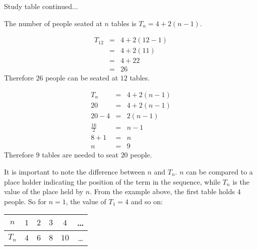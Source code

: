 \begin{wex}{Study table continued...}
{
The number of people seated at $n$ tables is $T_n = 4 + 2(n-1)$.


\begin{eqnarray*}
T_{12} &=& 4 + 2  (12 - 1) \\
&=& 4 + 2(11) \\
&=& 4 + 22 \\
&=& 26
\end{eqnarray*}
Therefore $26$ people can be seated at $12$ tables.

\begin{eqnarray*}
T_n &=& 4 + 2  (n - 1) \\
20 &=& 4 + 2  (n - 1) \\
20 - 4 &=& 2  (n - 1) \\
\frac{16}{2} &=& n - 1 \\
8 + 1 &=& n \\
n &=& 9
\end{eqnarray*}
Therefore $9$ tables are needed to seat $20$ people.
}
\end{wex}

It is important to note the difference between $n$ and ${T}_{n}$. $n$ can be compared to a place holder indicating the position of the term in the sequence, 
while ${T}_{n}$ is the value of the place held by $n$. From the example above, the first table holds $4$ people. So for $n=1$, the value of ${T}_{1}=4$ and so on:\par 
    
\begin{center}
\begin{tabular}{|c|c|c|c|c|c|}
\hline $n$ & $1$ & $2$ & $3$ & $4$ & \ldots \\
\hline $T_n$ & $4$ & $6$ & $8$ & $10$ & \ldots \\
\hline
\end{tabular}
\end{center}


